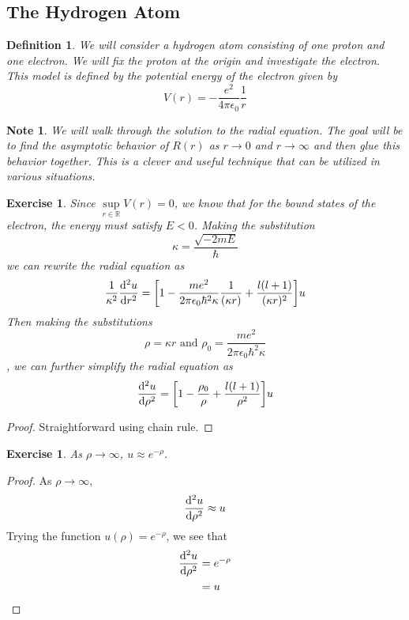 \documentclass[12pt]{amsart}
\newtheorem{defn}[thm]{Definition}
\newtheorem{note}[thm]{Note}
\newtheorem{ex}[thm]{Exercise}
\newcommand{\ep}{\epsilon}
\newcommand{\R}{\mathbb{R}}
\begin{document}
\subsection{The Hydrogen Atom}

\begin{defn}
We will consider a hydrogen atom consisting of one proton and one electron. We will fix the proton at the origin and investigate the electron. This model is defined by the potential energy of the electron given by $$V(r) = -\frac{e^2}{4\pi \ep_0}\frac{1}{r}$$
\end{defn}

\begin{note}
We will walk through the solution to the radial equation. The goal will be to find the asymptotic behavior of $R(r)$ as $r \rightarrow 0$ and $r \rightarrow \infty$ and then glue this behavior together. This is a clever and useful technique that can be utilized in various situations. 
\end{note}

\begin{ex}
Since $\sup\limits_{r \in \R} V(r) = 0$, we know that for the bound states of the electron, the energy must satisfy $E < 0$. Making the substitution $$\kappa = \frac{\sqrt{-2mE}}{\hbar}$$ we can rewrite the radial equation as $$\frac{1}{\kappa^2}\dv[2]{u}{r} = \bigg[1 - \frac{me^2}{2\pi\ep_0 \hbar^2 \kappa} \frac{1}{(\kappa r)} + \frac{l(l+1)}{(\kappa r)^2}\bigg]u$$ Then making the substitutions $$\rho = \kappa r \text{ and } \rho_0 = \frac{me^2}{2\pi\ep_0 \hbar^2 \kappa}$$, we can further simplify the radial equation as $$\dv[2]{u}{\rho} = \bigg[ 1 - \frac{\rho_0}{\rho} + \frac{l(l+1)}{\rho^2} \bigg]u$$
\end{ex}

\begin{proof}
Straightforward using chain rule.
\end{proof}

\begin{ex}
As $\rho \rightarrow \infty$, $u \approx e^{-\rho}$.
\end{ex}

\begin{proof}
As $\rho \rightarrow \infty$, $$\dv[2]{u}{\rho} \approx u$$ Trying the function $u(\rho) = e^{-\rho}$, we see that 
\begin{align*}
\dv[2]{u}{\rho} 
&= e^{-\rho} \\
&= u
\end{align*}
\end{proof}
\end{document}
